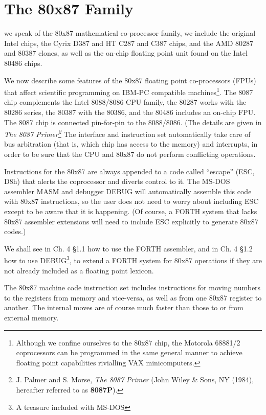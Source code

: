 
\chapter{The 80x87 Family}

 we speak of the 80x87 mathematical co-processor family, we include the original Intel chips, the Cyrix D387 and HT C287 and C387 chips, and the AMD 80287 and 80387 clones, as well as the on-chip floating point unit found on the Intel 80486 chips.

We now describe some features of the 80x87 floating point co-processors (FPUs) that affect scientific programming on IBM-PC compatible machines\footnote{Although we confine ourselves to the 80x87 chip, the Motorola 68881/2 coprocessors can be programmed in  the same general manner to achieve floating point capabilities rivialling VAX minicomputers.}. The 8087 chip complements the Intel 8088/8086 CPU family, the 80287 works with the 80286 series, the 80387 with the 80386, and the 80486 includes an on-chip FPU. The 8087 chip is connected pin-for-pin to the 8088/8086. (The details are given in \textit{The 8087 Primer\footnote{J. Palmer and S. Morse, \textit{The 8087 Primer} (John Wiley \& Sons, NY (1984), hereafter referred to as \textbf{8087P}).}} The interface and instruction set automatically take care of bus arbitration (that is, which chip has access to the memory) and interrupts, in order to be sure that the CPU and 80x87 do not perform conflicting operations.

Instructions for the 80x87 are always appended to a code called “escape” (ESC, D8h) that alerts the coprocessor and diverts control to it. The MS-DOS assembler MASM and debugger DEBUG will automatically assemble this code with 80x87 instructions, so the user does not need to worry about including ESC except to be aware that it is happening. (Of course, a FORTH system that lacks 80x87 assembler extensions will need to include ESC explicitly to generate 80x87 codes.)

We shall see in Ch. 4 §1.1 how to use the FORTH assembler, and in Ch. 4 §1.2 how to use DEBUG\footnote{A treasure included with MS-DOS}, to extend a FORTH system for 80x87 operations if they are not already included as a floating point lexicon.

The 80x87 machine code instruction set includes instructions for moving numbers to the registers from memory and vice-versa, as well as from one 80x87 register to another. The internal moves are of course much faster than those to or from external memory.


